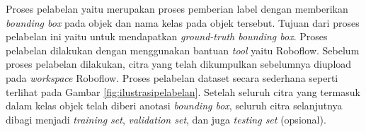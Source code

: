 Proses pelabelan yaitu merupakan proses pemberian label dengan memberikan \textit{bounding box} pada objek dan nama kelas pada objek tersebut. Tujuan dari proses pelabelan ini yaitu untuk mendapatkan \textit{ground-truth bounding box}. Proses pelabelan dilakukan dengan menggunakan bantuan \textit{tool} yaitu Roboflow. Sebelum proses pelabelan dilakukan, citra yang telah dikumpulkan sebelumnya diupload pada \textit{workspace} Roboflow. Proses pelabelan dataset secara sederhana seperti terlihat pada Gambar \ref*{fig:ilustrasipelabelan}. Setelah seluruh citra yang termasuk dalam kelas objek telah diberi anotasi \textit{bounding box}, seluruh citra selanjutnya dibagi menjadi \textit{training set}, \textit{validation set}, dan juga \textit{testing set} (opsional). \par

